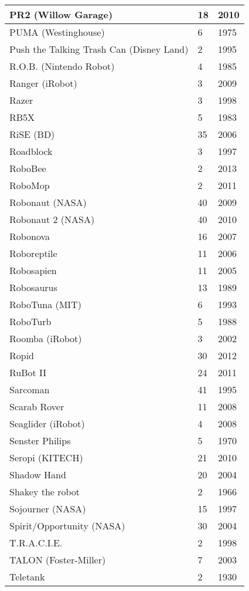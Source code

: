 \begin{center}
\begin{longtable}{l | l | l }
PR2 (Willow Garage)	&	18	&	2010	\\	\hline
PUMA (Westinghouse) \cite{robotpuma239137}	&	6	&	1975	\\	\hline
Push the Talking Trash Can (Disney Land)	&	2	&	1995	\\	\hline
R.O.B. (Nintendo Robot)	&	4	&	1985	\\	\hline
Ranger (iRobot)	&	3	&	2009	\\	\hline
Razer	&	3	&	1998	\\	\hline
RB5X	&	5	&	1983	\\	\hline
RiSE (BD)	&	35	&	2006	\\	\hline
Roadblock	&	3	&	1997	\\	\hline
RoboBee	&	2	&	2013	\\	\hline
RoboMop	&	2	&	2011	\\	\hline
Robonaut (NASA)	&	40	&	2009	\\	\hline
Robonaut 2 (NASA)	&	40	&	2010	\\	\hline
Robonova \cite{robotrobonova}	&	16	&	2007	\\	\hline
Roboreptile	&	11	&	2006	\\	\hline
Robosapien	&	11	&	2005	\\	\hline
Robosaurus	&	13	&	1989	\\	\hline
RoboTuna (MIT)	&	6	&	1993	\\	\hline
RoboTurb	&	5	&	1988	\\	\hline
Roomba (iRobot)	&	3	&	2002	\\	\hline
Ropid	&	30	&	2012	\\	\hline
RuBot II	&	24	&	2011	\\	\hline
Sarcoman	&	41	&	1995	\\	\hline
Scarab Rover	&	11	&	2008	\\	\hline
Seaglider (iRobot)	&	4	&	2008	\\	\hline
Senster Philips	&	5	&	1970	\\	\hline
Seropi (KITECH)	&	21	&	2010	\\	\hline
Shadow Hand	&	20	&	2004	\\	\hline
Shakey the robot	&	2	&	1966	\\	\hline
Sojourner (NASA)	&	15	&	1997	\\	\hline
Spirit/Opportunity (NASA)	&	30	&	2004	\\	\hline
T.R.A.C.I.E.	&	2	&	1998	\\	\hline
TALON (Foster-Miller)	&	7	&	2003	\\	\hline
Teletank \cite{robotTelitankSpringer2013military}	&	2	&	1930	\\	\hline

\end{longtable}
\end{center}
